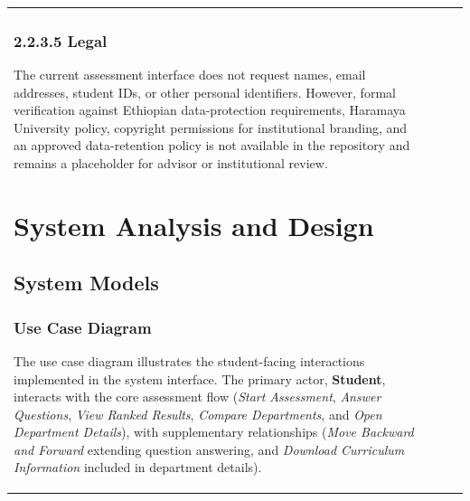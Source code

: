 \documentclass[12pt, a4paper]{article}
\begin{document}
\begin{itemize}[leftmargin=1.5em, itemsep=3pt]
\begin{table}[H]
\begin{tabularx}{\textwidth}{>{\raggedright\arraybackslash}p{0.8cm}>{\raggedright\arraybackslash}p{3.5cm}>{\raggedright\arraybackslash}X>{\raggedright\arraybackslash}p{2.5cm}}
\subsubsection*{2.2.3.5 Legal}

The current assessment interface does not request names, email addresses, student IDs, or other personal identifiers. However, formal verification against Ethiopian data-protection requirements, Haramaya University policy, copyright permissions for institutional branding, and an approved data-retention policy is not available in the repository and remains a placeholder for advisor or institutional review.

\clearpage

\newpage
\clearpage
\section{System Analysis and Design}
\subsection{System Models}






\subsubsection*{Use Case Diagram}

The use case diagram illustrates the student-facing interactions implemented in the system interface. The primary actor, \textbf{Student}, interacts with the core assessment flow (\textit{Start Assessment}, \textit{Answer Questions}, \textit{View Ranked Results}, \textit{Compare Departments}, and \textit{Open Department Details}), with supplementary relationships (\textit{Move Backward and Forward} extending question answering, and \textit{Download Curriculum Information} included in department details).


\end{tabularx}
\end{table}
\end{itemize}
\end{document}
